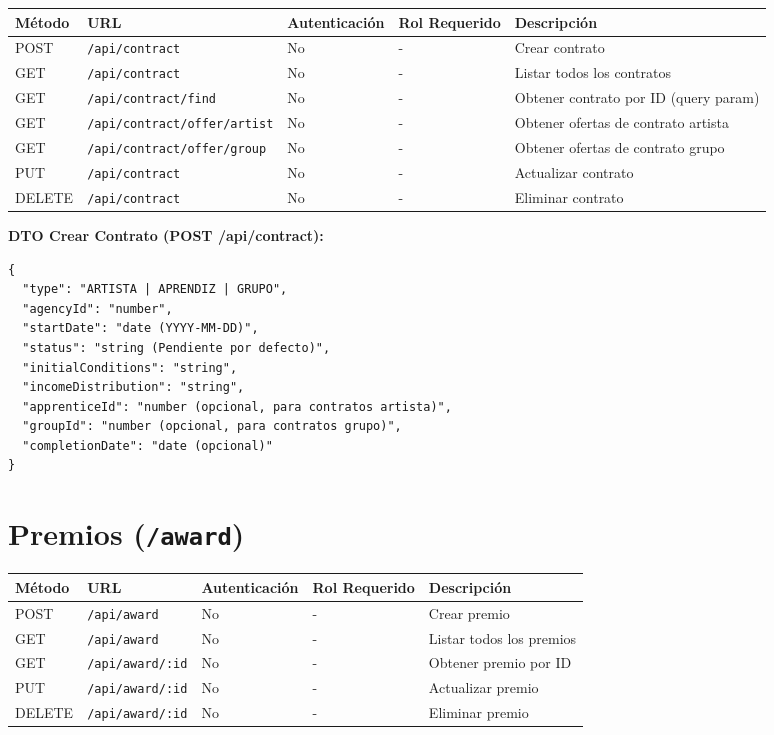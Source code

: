 \documentclass[11pt]{article}
\begin{document}
\begin{longtable}{lllll}
\toprule
\textbf{Método} & \textbf{URL} & \textbf{Autenticación} & \textbf{Rol Requerido} & \textbf{Descripción} \\
\midrule
\endhead
POST & \texttt{/api/contract} & No & - & Crear contrato \\
GET & \texttt{/api/contract} & No & - & Listar todos los contratos \\
GET & \texttt{/api/contract/find} & No & - & Obtener contrato por ID (query param) \\
GET & \texttt{/api/contract/offer/artist} & No & - & Obtener ofertas de contrato artista \\
GET & \texttt{/api/contract/offer/group} & No & - & Obtener ofertas de contrato grupo \\
PUT & \texttt{/api/contract} & No & - & Actualizar contrato \\
DELETE & \texttt{/api/contract} & No & - & Eliminar contrato \\
\bottomrule
\end{longtable}

\textbf{DTO Crear Contrato (POST /api/contract):}
\begin{Verbatim}
{
  "type": "ARTISTA | APRENDIZ | GRUPO",
  "agencyId": "number",
  "startDate": "date (YYYY-MM-DD)",
  "status": "string (Pendiente por defecto)",
  "initialConditions": "string",
  "incomeDistribution": "string",
  "apprenticeId": "number (opcional, para contratos artista)",
  "groupId": "number (opcional, para contratos grupo)",
  "completionDate": "date (opcional)"
}
\end{Verbatim}

\section{Premios (\texttt{/award})}

\begin{longtable}{lllll}
\toprule
\textbf{Método} & \textbf{URL} & \textbf{Autenticación} & \textbf{Rol Requerido} & \textbf{Descripción} \\
\midrule
\endhead
POST & \texttt{/api/award} & No & - & Crear premio \\
GET & \texttt{/api/award} & No & - & Listar todos los premios \\
GET & \texttt{/api/award/:id} & No & - & Obtener premio por ID \\
PUT & \texttt{/api/award/:id} & No & - & Actualizar premio \\
DELETE & \texttt{/api/award/:id} & No & - & Eliminar premio \\
\bottomrule
\end{longtable}
\end{document}

